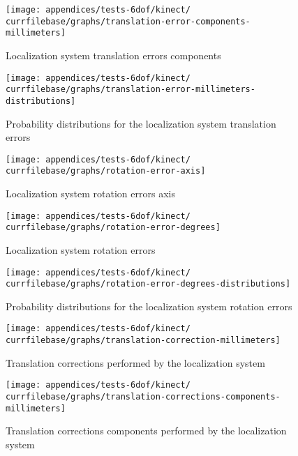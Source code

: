 \begin{figure}[H]
	\centering
	\texttt{[image: appendices/tests-6dof/kinect/\\currfilebase/graphs/translation-error-components-millimeters]}
	\caption{Localization system translation errors components}
\end{figure}


\begin{figure}[H]
	\centering
	\texttt{[image: appendices/tests-6dof/kinect/\\currfilebase/graphs/translation-error-millimeters-distributions]}
	\caption{Probability distributions for the localization system translation errors}
\end{figure}



\begin{figure}[H]
	\centering
	\texttt{[image: appendices/tests-6dof/kinect/\\currfilebase/graphs/rotation-error-axis]}
	\caption{Localization system rotation errors axis}
\end{figure}


\begin{figure}[H]
	\centering
	\texttt{[image: appendices/tests-6dof/kinect/\\currfilebase/graphs/rotation-error-degrees]}
	\caption{Localization system rotation errors}
\end{figure}


\begin{figure}[H]
	\centering
	\texttt{[image: appendices/tests-6dof/kinect/\\currfilebase/graphs/rotation-error-degrees-distributions]}
	\caption{Probability distributions for the localization system rotation errors}
\end{figure}


\begin{figure}[H]
	\centering
	\texttt{[image: appendices/tests-6dof/kinect/\\currfilebase/graphs/translation-correction-millimeters]}
	\caption{Translation corrections performed by the localization system}
\end{figure}

\begin{figure}[H]
	\centering
	\texttt{[image: appendices/tests-6dof/kinect/\\currfilebase/graphs/translation-corrections-components-millimeters]}
	\caption{Translation corrections components performed by the localization system}
\end{figure}

